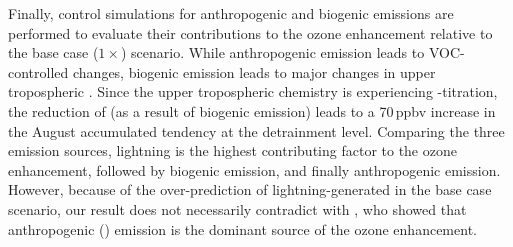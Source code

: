 Finally, control simulations for anthropogenic and biogenic emissions are performed to evaluate their contributions
to the ozone enhancement relative to the base case ($1\times$) scenario. While anthropogenic emission leads to
VOC-controlled changes, biogenic emission leads to major changes in upper tropospheric . Since the
upper tropospheric chemistry is experiencing -titration, the reduction of  (as a result of
biogenic emission) leads to a 70\,\unit{ppbv} increase in the August accumulated tendency at the detrainment level.
Comparing the three emission sources, lightning is the highest contributing factor to the ozone enhancement, followed by
biogenic emission, and finally anthropogenic emission. However, because of the over-prediction of lightning-generated
 in the base case scenario, our result does not necessarily contradict with \citet{Li:2005ss}, who
showed that anthropogenic () emission is the dominant source of the ozone enhancement.